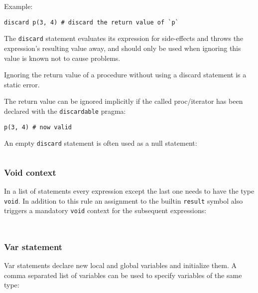 Example:

\begin{verbatim}
discard p(3, 4) # discard the return value of `p`
\end{verbatim}

The \texttt{discard} statement evaluates its expression for side-effects
and throws the expression's resulting value away, and should only be
used when ignoring this value is known not to cause problems.

Ignoring the return value of a procedure without using a discard
statement is a static error.

The return value can be ignored implicitly if the called proc/iterator
has been declared with the \texttt{discardable} pragma:

\begin{verbatim}
p(3, 4) # now valid
\end{verbatim}

An empty \texttt{discard} statement is often used as a null statement:

\begin{verbatim}
\end{verbatim}

\hypertarget{void-context}{%
\subsubsection{Void context}\label{void-context}}

In a list of statements every expression except the last one needs to
have the type \texttt{void}. In addition to this rule an assignment to
the builtin \texttt{result} symbol also triggers a mandatory
\texttt{void} context for the subsequent expressions:

\begin{verbatim}
\end{verbatim}

\begin{verbatim}
\end{verbatim}

\hypertarget{var-statement}{%
\subsubsection{Var statement}\label{var-statement}}

Var statements declare new local and global variables and initialize
them. A comma separated list of variables can be used to specify
variables of the same type:

